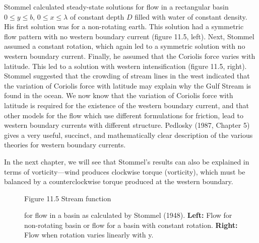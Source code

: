 Stommel calculated steady-state solutions for flow in a rectangular
basin $0\leq y\leq b$, $0\leq x\leq \lambda$ of constant depth $D$
filled with water of constant density. His first solution was for a
non-rotating earth. This solution had a symmetric flow pattern with no
western boundary current (figure 11.5, left). Next, Stommel assumed a
constant rotation, which again led to a symmetric solution with no
western boundary current. Finally, he assumed that the Coriolis force
varies with latitude. This led to a solution with western
intensification (figure 11.5, right). Stommel suggested that the
crowding of stream lines in the west indicated that the variation of
Coriolis force with latitude may explain why the Gulf
Stream is found in the
ocean. We now know that the variation of Coriolis force with latitude
is required for the existence of the western boundary current, and
that other models for the flow which use different formulations for
friction, lead to western boundary currents with different
structure. Pedlosky (1987, Chapter 5) gives a very useful, succinct,
and mathematically clear description of the various theories for
western boundary currents.

In the next chapter, we will see that Stommel's results can also be
explained in terms of vorticity---wind produces clockwise torque
(vorticity), which must be balanced by a counterclockwise torque
produced at the western boundary.

\begin{figure}[h!]
\footnotesize
Figure 11.5 Stream function \rule{0pt}{3ex}for flow in a basin as
calculated by Stommel (1948).  \textbf{Left:} Flow for non-rotating
basin or flow for a basin with constant rotation. \textbf{Right:} Flow
when rotation varies linearly with y.
\label{fig:stommelcurrents}
\vspace{-3ex}
\end{figure}

